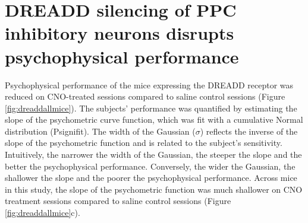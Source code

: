 \section{DREADD silencing of PPC inhibitory neurons disrupts psychophysical performance}
Psychophysical performance of the mice expressing the DREADD receptor was reduced on CNO-treated sessions compared to saline control sessions (Figure \ref{fig:dreaddallmice}). The subjects' performance was quantified by estimating the slope of the psychometric curve function, which was fit with a cumulative Normal distribution (Psignifit). The width of the Gaussian ($\sigma$) reflects the inverse of the slope of the psychometric function and is related to the subject's sensitivity. Intuitively, the narrower the width of the Gaussian, the steeper the slope and the better the psychophysical performance. Conversely, the wider the Gaussian, the shallower the slope and the poorer the psychophysical performance. Across mice in this study, the slope of the psychometric function was much shallower on CNO treatment sessions compared to saline control sessions (Figure \ref{fig:dreaddallmice}c).\par 

